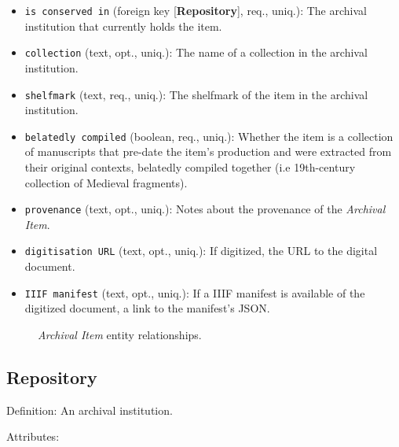 \begin{itemize}
    \item \texttt{is conserved in} (foreign key [\textbf{Repository}], req., uniq.): The archival institution that currently holds the item.
    \item \texttt{collection} (text, opt., uniq.): The name of a collection in the archival institution.
    \item \texttt{shelfmark} (text, req., uniq.): The shelfmark of the item in the archival institution.
    \item \texttt{belatedly compiled} (boolean, req., uniq.): Whether the item is a collection of manuscripts that pre-date the item's production and were extracted from their original contexts, belatedly compiled together (i.e 19th-century collection of Medieval fragments).
    \item \texttt{provenance} (text, opt., uniq.): Notes about the provenance of the \textit{Archival Item}.
    \item \texttt{digitisation URL} (text, opt., uniq.): If digitized, the URL to the digital document.
    \item \texttt{IIIF manifest} (text, opt., uniq.): If a IIIF manifest is available of the digitized document, a link to the manifest's JSON.
\end{itemize}

\begin{figure}[ht]
    \begin{center}
        
    \end{center}
\label{fig:ArchivalER}
\caption{\textit{Archival Item} entity relationships.}
\end{figure}


\subsection{Repository}

Definition: An archival institution.

\vspace{1em}
\noindent Attributes:


